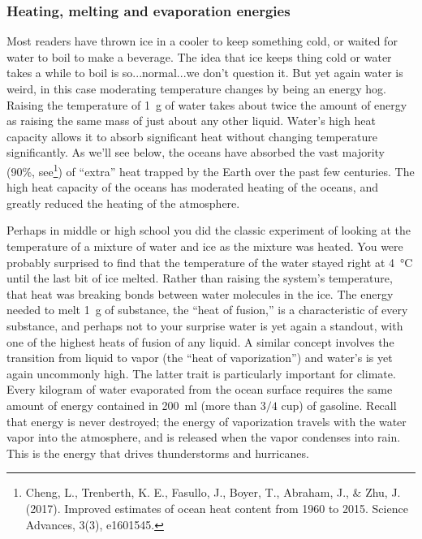 \subsubsection{Heating, melting and evaporation energies}\label{water_emp}
Most readers have thrown ice in a cooler to keep something cold, or waited for water to boil to make a beverage. The idea that ice keeps thing cold or water takes a while to boil is so...normal...we don't question it. But yet again water is weird, in this case moderating temperature changes by being an energy hog. Raising the temperature of \SI{1}{\gram} of water takes about twice the amount of energy as raising the same mass of just about any other liquid. Water's high heat capacity allows it to absorb significant heat without changing temperature significantly. As we'll see below, the oceans have absorbed the vast majority (90\%, see\footnote{Cheng, L., Trenberth, K. E., Fasullo, J., Boyer, T., Abraham, J., \& Zhu, J. (2017). Improved estimates of ocean heat content from 1960 to 2015. Science Advances, 3(3), e1601545.}) of ``extra'' heat trapped by the Earth over the past few centuries. The high heat capacity of the oceans has moderated heating of the oceans, and greatly reduced the heating of the atmosphere. 

Perhaps in middle or high school you did the classic experiment of looking at the temperature of a mixture of water and ice as the mixture was heated. You were probably surprised to find that the temperature of the water stayed right at \SI{4}{\degreeCelsius} until the last bit of ice melted. Rather than raising the system's temperature, that heat was breaking bonds between water molecules in the ice. The energy needed to melt \SI{1}{\gram} of substance, the ``heat of fusion,'' is a characteristic of every substance, and perhaps not to your surprise water is yet again a standout, with one of the highest heats of fusion of any liquid. A similar concept involves the transition from liquid to vapor (the ``heat of vaporization'') and water's is yet again uncommonly high. The latter trait is particularly important for climate. Every kilogram of water evaporated from the ocean surface requires the same amount of energy contained in \SI{200}{\milli\litre} (more than $3/4$ cup) of gasoline. Recall that energy is never destroyed; the energy of vaporization travels with the water vapor into the atmosphere, and is released when the vapor condenses into rain. This is the energy that drives thunderstorms and hurricanes.             
